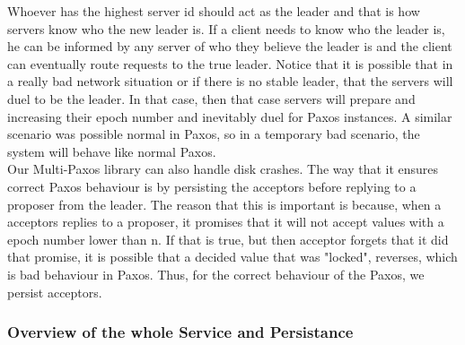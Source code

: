 \documentclass[a4paper]{article}
\begin{document}
Whoever has the highest server id should act as the leader and that is how servers know who the new leader is.
If a client needs to know who the leader is, he can be informed by any server of who they believe the leader is and the client can eventually route requests to the true leader.
Notice that it is possible that in a really bad network situation or if there is no stable leader, that the servers will duel to be the leader.
In that case, then that case servers will prepare and increasing their epoch number and inevitably duel for Paxos instances.
A similar scenario was possible normal in Paxos, so in a temporary bad scenario, the system will  behave like normal Paxos.
\\
\indent Our Multi-Paxos library can also handle disk crashes.
The way that it ensures correct Paxos behaviour is by persisting the acceptors before replying to a proposer from the leader.
The reason that this is important is because, when a acceptors replies to a proposer, it promises that it will not accept values with a epoch number lower than n.
If that is true, but then acceptor forgets that it did that promise, it is possible that a decided value that was "locked", reverses, which is bad behaviour in Paxos.
Thus, for the correct behaviour of the Paxos, we persist acceptors.

\subsubsection{Overview of the whole Service and Persistance}
\end{document}
